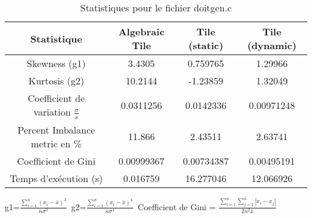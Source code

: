 \documentclass{article}
\begin{document}
\begin{table}[htbp]
  \centering
  \caption{Statistiques pour le fichier doitgen.c}
  \begin{tabular}{|c|c|c|c|}
    \hline
    Statistique & Algebraic Tile & Tile (static) & Tile (dynamic) \\ 
    \hline
    Skewness (g1)  & 3.4305 & 0.759765 & 1.29966 \\ 
    Kurtosis (g2)  & 10.2144 & -1.23859 & 1.32049 \\ 
    Coefficient de variation $ \frac{\sigma}{\overline{x}} $ & 0.0311256 & 0.0142336 & 0.00971248\\ 
    Percent Imbalance metric en \% & 11.866 & 2.43511 & 2.63741\\ 
    Coefficient de Gini  & 0.00999367 & 0.00734387 & 0.00495191\\ 
    Temps d'exécution (s) &  0.016759    &  16.277046   &  12.066926   \\ 

    \hline
  \end{tabular}
\end{table}\newline
g1=$ \frac{\sum_{i=1}^{n} (x_i - \overline{x})^3}{n\sigma^3} $\
g2=$ \frac{\sum_{i=1}^{n} (x_i - \overline{x})^4}{n\sigma^4} $\
Coefficient de Gini = $ \frac{\sum_{i=1}^{n}\sum_{j=1}^{n} |x_i - x_j|}{2n^2\overline{x}} $\
\newpage
\end{document}
